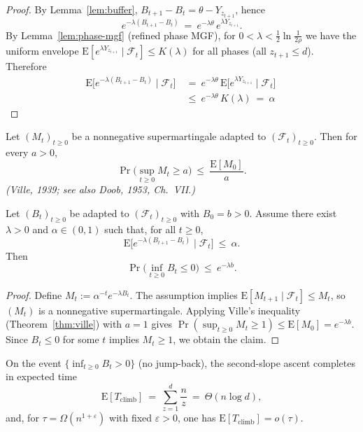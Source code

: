 \documentclass[lettersize,journal]{IEEEtran}
\newcommand{\EE}{\text{E}}
\begin{document}
\begin{proof}
	By Lemma~\ref{lem:buffer}, $B_{t+1}-B_t=\theta-Y_{z_{t+1}}$, hence
	\[
	e^{-\lambda(B_{t+1}-B_t)}\ =\ e^{-\lambda\theta}\,e^{\lambda Y_{z_{t+1}}}.
	\]
	By Lemma~\ref{lem:phase-mgf} (refined phase MGF), for $0<\lambda<\tfrac12\ln\!\tfrac{1}{2\rho}$ we have the uniform envelope
	$\EE[e^{\lambda Y_{z_{t+1}}}\mid\mathcal F_t]\le K(\lambda)$ for all phases (all $z_{t+1}\le d$). Therefore
	\begin{align*}
	\EE\!\big[e^{-\lambda(B_{t+1}-B_t)}\mid \mathcal F_t\big]
	\ &=\ e^{-\lambda\theta}\,\EE\!\big[e^{\lambda Y_{z_{t+1}}}\mid\mathcal F_t\big]
	\ \\ &\le\ e^{-\lambda\theta}\,K(\lambda)
	\ =\ \alpha	
	\end{align*}
\end{proof}
\begin{theorem}\label{thm:ville}
	Let $(M_t)_{t\ge 0}$ be a nonnegative supermartingale adapted to $(\mathcal F_t)_{t\ge 0}$. 
	Then for every $a>0$,
	\[
	\Pr\!\big(\sup_{t\ge 0} M_t \ge a\big)\ \le\ \frac{\EE[M_0]}{a}.
	\]
	\emph{(Ville, 1939; see also Doob, 1953, Ch.~VII.)}
\end{theorem}

\begin{corollary}\label{cor:ville-exponential}
	Let $(B_t)_{t\ge 0}$ be adapted to $(\mathcal F_t)_{t\ge 0}$ with $B_0=b>0$.
	Assume there exist $\lambda>0$ and $\alpha\in(0,1)$ such that, for all $t\ge 0$,
	\[
	\EE\!\big[e^{-\lambda(B_{t+1}-B_t)}\mid \mathcal F_t\big]\ \le\ \alpha.
	\]
	Then
	\[
	\Pr\!\big(\inf_{t\ge 0} B_t \le 0\big)\ \le\ e^{-\lambda b}.
	\]
\end{corollary}

\begin{proof}
	Define $M_t:=\alpha^{-t}e^{-\lambda B_t}$. The assumption implies
	$\EE[M_{t+1}\mid\mathcal F_t]\le M_t$, so $(M_t)$ is a nonnegative supermartingale.
	Applying Ville’s inequality (Theorem~\ref{thm:ville}) with $a=1$ gives
	$\Pr(\sup_{t\ge 0} M_t\ge 1)\le \EE[M_0]=e^{-\lambda b}$.
	Since $B_t\le 0$ for some $t$ implies $M_t\ge 1$, we obtain the claim.
	
\end{proof}


\begin{lemma}\label{prop:climb-time}
	On the event $\{\inf_{t\ge 0} B_t>0\}$ (no jump-back), the second-slope ascent completes in expected time
	\[
	\EE[T_{\mathrm{climb}}]\ =\ \sum_{z=1}^{d}\frac{n}{z}\ =\ \Theta(n\log d),
	\]
	and, for $\tau=\Omega(n^{1+\varepsilon})$ with fixed $\varepsilon>0$, one has $\EE[T_{\mathrm{climb}}]=o(\tau)$.
\end{lemma}
\end{document}
